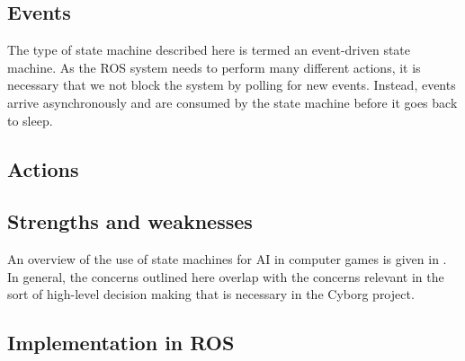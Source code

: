 \documentclass[\rootfolder/main.tex]{subfiles}
\begin{document}

\subsection{Events}

The type of state machine described here is termed an event-driven state machine.
As the ROS system needs to perform many different actions, it is necessary that we not block the system by polling for new events.
Instead, events arrive asynchronously and are consumed by the state machine before it goes back to sleep.


\subsection{Actions}


\subsection{Strengths and weaknesses}
\label{sec:state_machine_strength_weaknesses}

An overview of the use of state machines for AI in computer games is given in \cite{Millington2009}.
In general, the concerns outlined here overlap with the concerns relevant in the sort of high-level decision making that is necessary in the Cyborg project.


\subsection{Implementation in ROS}
\end{document}
